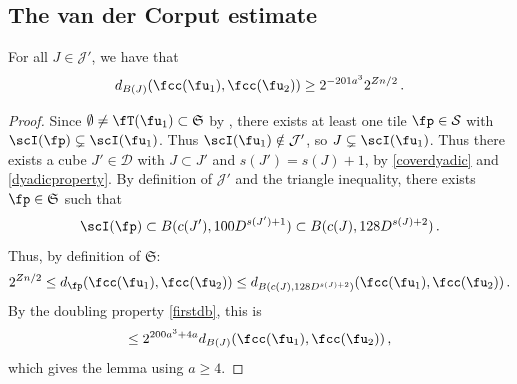 \subsection{The van der Corput estimate}
\label{subsubsec-van-der-corput}
    \begin{lemma}
        \label{lower-oscillation-bound}
        For all $J \in \mathcal{J}'$, we have that
        $$
            d_{B(J)}(\fcc(\fu_1), \fcc(\fu_2)) \ge 2^{-201a^3} 2^{Zn/2}\,.
        $$
    \end{lemma}

    \begin{proof}
    Since $\emptyset \ne \fT(\fu_1) \subset \mathfrak{S}$ by , there exists at least one tile $\fp \in \mathcal{S}$ with $\scI(\fp) \subsetneq \scI(\fu_1)$. Thus $\scI(\fu_1) \notin \mathcal{J}'$, so $J \subsetneq \scI(\fu_1)$. Thus there exists a cube $J' \in \mathcal{D}$ with $J \subset J'$ and $s(J') = s(J) + 1$, by \eqref{coverdyadic} and \eqref{dyadicproperty}. By definition of $\mathcal{J'}$ and the triangle inequality, there exists $\fp \in \mathfrak{S}$ such that
    $$
        \scI(\fp) \subset B(c(J'), 100 D^{s(J') + 1}) \subset B(c(J), 128 D^{s(J)+2})\,.
    $$
    Thus, by definition of $\mathfrak{S}$:
    \begin{align*}
        2^{Zn/2} \le d_{\fp}(\fcc(\fu_1), \fcc(\fu_2)) \le d_{B(c(J), 128 D^{s(J)+2})}(\fcc(\fu_1), \fcc(\fu_2))\,.
    \end{align*}
    By the doubling property \eqref{firstdb}, this is
    $$
        \le 2^{200a^3 + 4a} d_{B(J)}(\fcc(\fu_1), \fcc(\fu_2))\,,
    $$
    which gives the lemma using $a \ge 4$.
    \end{proof}

